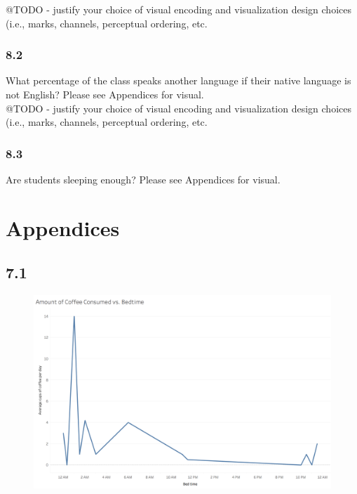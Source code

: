 \documentclass{neu_handout}
\begin{document}
@TODO - justify your choice of visual encoding and visualization design choices (i.e., marks, channels,
perceptual ordering, etc.

\subsubsection*{8.2}
What percentage of the class speaks another language if their native language is not English? Please see Appendices for visual.\\

@TODO - justify your choice of visual encoding and visualization design choices (i.e., marks, channels,
perceptual ordering, etc.

\subsubsection*{8.3}
Are students sleeping enough? Please see Appendices for visual.\\

\appendix
\section{Appendices}

\subsection*{7.1}
\begin{figure}[h]
\centering
{
\includegraphics[width=0.7\linewidth]{bedtime_coffee}
}
\end{figure}
\end{document}
